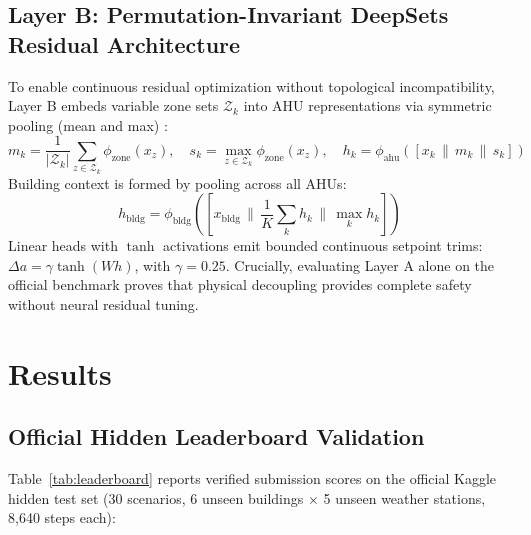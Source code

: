 \documentclass{article}
\begin{document}
\subsection{Layer B: Permutation-Invariant DeepSets Residual Architecture}
To enable continuous residual optimization without topological incompatibility, Layer B embeds variable zone sets $\mathcal{Z}_k$ into AHU representations via symmetric pooling (mean and max) \cite{zaheer2017deep}:
\begin{equation}
m_k = \frac{1}{|\mathcal{Z}_k|} \sum_{z \in \mathcal{Z}_k} \phi_{\text{zone}}(x_z), \quad s_k = \max_{z \in \mathcal{Z}_k} \phi_{\text{zone}}(x_z), \quad h_k = \phi_{\text{ahu}}([x_k \,\|\, m_k \,\|\, s_k])
\end{equation}
Building context is formed by pooling across all AHUs:
\begin{equation}
h_{\text{bldg}} = \phi_{\text{bldg}}\left( \left[ x_{\text{bldg}} \,\|\, \frac{1}{K}\sum_k h_k \,\|\, \max_k h_k \right] \right)
\end{equation}
Linear heads with $\tanh$ activations emit bounded continuous setpoint trims: $\Delta a = \gamma \tanh(W h)$, with $\gamma = 0.25$. Crucially, evaluating Layer A alone on the official benchmark proves that physical decoupling provides complete safety without neural residual tuning.

\section{Results}

\subsection{Official Hidden Leaderboard Validation}
Table~\ref{tab:leaderboard} reports verified submission scores on the official Kaggle hidden test set (30 scenarios, 6 unseen buildings $\times$ 5 unseen weather stations, 8,640 steps each):
\end{document}
